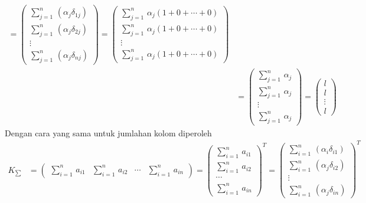 \documentclass[11pt,a4paper]{article}
\newcommand{\ds}{\displaystyle}
\theoremstyle{plain}
\theoremstyle{definition}
\theoremstyle{remark}
\begin{document}
\begin{enumerate}
\begin{enumerate}
\begin{align*}
	= \begin{pmatrix} 
	\ds \sum_{j=1}^{n}\,(\alpha_{j}\delta_{1j})\\ 
	\ds \sum_{j=1}^{n}\,(\alpha_{j}\delta_{2j})\\ 
	\vdots \\
	\ds \sum_{j=1}^{n}\,(\alpha_{j}\delta_{nj})
	\end{pmatrix} 
	= \begin{pmatrix} 
	\ds \sum_{j=1}^{n}\,\alpha_{j}(1+0+\cdots+0)\\ 
	\ds \sum_{j=1}^{n}\,\alpha_{j}(1+0+\cdots+0)\\ 
	\vdots \\
	\ds \sum_{j=1}^{n}\,\alpha_{j}(1+0+\cdots+0)
	\end{pmatrix}  \\
	&= \begin{pmatrix} 
	\ds \sum_{j=1}^{n}\,\alpha_{j}\\ 
	\ds \sum_{j=1}^{n}\,\alpha_{j}\\ 
	\vdots \\
	\ds \sum_{j=1}^{n}\,\alpha_{j}
	\end{pmatrix} 
	= \begin{pmatrix} 
	\ds l\\ 
	\ds l\\ 
	\vdots \\
	\ds l
	\end{pmatrix}
	\end{align*}
	Dengan cara yang sama untuk jumlahan kolom diperoleh
	\begin{align*}
	\ds K_{\sum} &= \begin{pmatrix}
	\ds \sum_{i=1}^{n}\, a_{i1} & 
	\ds \sum_{i=1}^{n}\, a_{i2} & 
	\cdots &
	\ds \sum_{i=1}^{n}\, a_{in}
	\end{pmatrix}
	= \begin{pmatrix}
	\ds \sum_{i=1}^{n}\, a_{i1} \\
	\ds \sum_{i=1}^{n}\, a_{i2} \\ 
	\cdots \\
	\ds \sum_{i=1}^{n}\, a_{in}
	\end{pmatrix}^{T}
	= \begin{pmatrix} 
	\ds \sum_{i=1}^{n}\,(\alpha_{i}\delta_{i1})\\ 
	\ds \sum_{i=1}^{n}\,(\alpha_{j}\delta_{i2})\\ 
	\vdots \\
	\ds \sum_{i=1}^{n}\,(\alpha_{j}\delta_{in})
	\end{pmatrix}^{T} \\

\end{align*}
\end{enumerate}
\end{enumerate}
\end{document}
